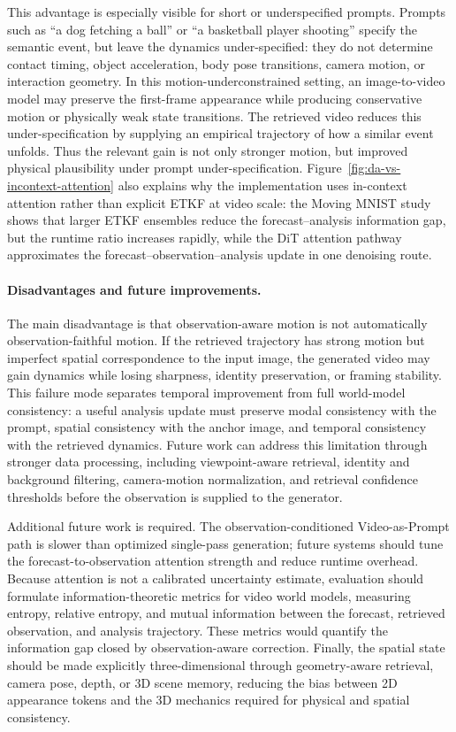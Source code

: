 \documentclass{article}
\begin{document}
This advantage is especially visible for short or underspecified prompts. Prompts such as ``a dog fetching a ball'' or ``a basketball player shooting'' specify the semantic event, but leave the dynamics under-specified: they do not determine contact timing, object acceleration, body pose transitions, camera motion, or interaction geometry. In this motion-underconstrained setting, an image-to-video model may preserve the first-frame appearance while producing conservative motion or physically weak state transitions. The retrieved video reduces this under-specification by supplying an empirical trajectory of how a similar event unfolds. Thus the relevant gain is not only stronger motion, but improved physical plausibility under prompt under-specification. Figure~\ref{fig:da-vs-incontext-attention} also explains why the implementation uses in-context attention rather than explicit ETKF at video scale: the Moving MNIST study shows that larger ETKF ensembles reduce the forecast--analysis information gap, but the runtime ratio increases rapidly, while the DiT attention pathway approximates the forecast--observation--analysis update in one denoising route.

\paragraph{Disadvantages and future improvements.}
The main disadvantage is that observation-aware motion is not automatically observation-faithful motion. If the retrieved trajectory has strong motion but imperfect spatial correspondence to the input image, the generated video may gain dynamics while losing sharpness, identity preservation, or framing stability. This failure mode separates temporal improvement from full world-model consistency: a useful analysis update must preserve modal consistency with the prompt, spatial consistency with the anchor image, and temporal consistency with the retrieved dynamics. Future work can address this limitation through stronger data processing, including viewpoint-aware retrieval, identity and background filtering, camera-motion normalization, and retrieval confidence thresholds before the observation is supplied to the generator.

Additional future work is required. The observation-conditioned Video-as-Prompt path is slower than optimized single-pass generation; future systems should tune the forecast-to-observation attention strength and reduce runtime overhead. Because attention is not a calibrated uncertainty estimate, evaluation should formulate information-theoretic metrics for video world models, measuring entropy, relative entropy, and mutual information between the forecast, retrieved observation, and analysis trajectory. These metrics would quantify the information gap closed by observation-aware correction. Finally, the spatial state should be made explicitly three-dimensional through geometry-aware retrieval, camera pose, depth, or 3D scene memory, reducing the bias between 2D appearance tokens and the 3D mechanics required for physical and spatial consistency.
\end{document}
